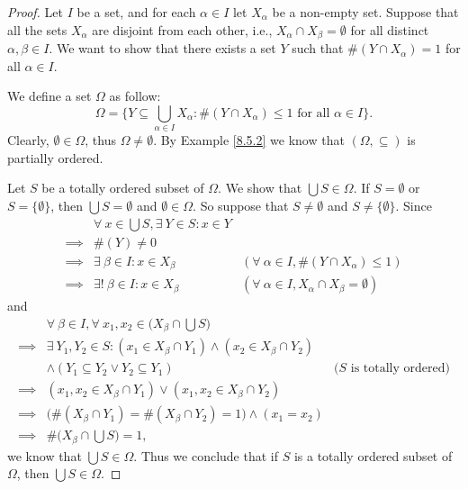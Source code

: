 \begin{proof}
    Let \(I\) be a set, and for each \(\alpha \in I\) let \(X_{\alpha}\) be a non-empty set.
    Suppose that all the sets \(X_{\alpha}\) are disjoint from each other, i.e., \(X_{\alpha} \cap X_{\beta} = \emptyset\) for all distinct \(\alpha, \beta \in I\).
    We want to show that there exists a set \(Y\) such that \(\#(Y \cap X_{\alpha}) = 1\) for all \(\alpha \in I\).

    We define a set \(\Omega\) as follow:
    \[
        \Omega = \{Y \subseteq \bigcup_{\alpha \in I} X_{\alpha} : \#(Y \cap X_{\alpha}) \leq 1 \text{ for all } \alpha \in I\}.
    \]
    Clearly, \(\emptyset \in \Omega\), thus \(\Omega \neq \emptyset\).
    By Example \ref{8.5.2} we know that \((\Omega, \subseteq)\) is partially ordered.

    Let \(S\) be a totally ordered subset of \(\Omega\).
    We show that \(\bigcup S \in \Omega\).
    If \(S = \emptyset\) or \(S = \{\emptyset\}\), then \(\bigcup S = \emptyset\) and \(\emptyset \in \Omega\).
    So suppose that \(S \neq \emptyset\) and \(S \neq \{\emptyset\}\).
    Since
    \begin{align*}
                 & \forall\ x \in \bigcup S, \exists\ Y \in S : x \in Y                                                                  \\
        \implies & \#(Y) \neq 0                                                                                                          \\
        \implies & \exists\ \beta \in I : x \in X_{\beta}               & (\forall\ \alpha \in I, \#(Y \cap X_{\alpha}) \leq 1)          \\
        \implies & \exists!\ \beta \in I : x \in X_{\beta}              & (\forall\ \alpha \in I, X_{\alpha} \cap X_{\beta} = \emptyset)
    \end{align*}
    and
    \begin{align*}
                 & \forall\ \beta \in I, \forall\ x_1, x_2 \in \Big(X_{\beta} \cap \bigcup S\Big)                                                \\
        \implies & \exists\ Y_1, Y_2 \in S : (x_1 \in X_{\beta} \cap Y_1) \land (x_2 \in X_{\beta} \cap Y_2)                                     \\
                 & \land (Y_1 \subseteq Y_2 \lor Y_2 \subseteq Y_1)                                          & \text{(\(S\) is totally ordered)} \\
        \implies & (x_1, x_2 \in X_{\beta} \cap Y_1) \lor (x_1, x_2 \in X_{\beta} \cap Y_2)                                                      \\
        \implies & \big(\#(X_{\beta} \cap Y_1) = \#(X_{\beta} \cap Y_2) = 1\big) \land (x_1 = x_2)                                               \\
        \implies & \#\Big(X_{\beta} \cap \bigcup S\Big) = 1,
    \end{align*}
    we know that \(\bigcup S \in \Omega\).
    Thus we conclude that if \(S\) is a totally ordered subset of \(\Omega\), then \(\bigcup S \in \Omega\).


\end{proof}

